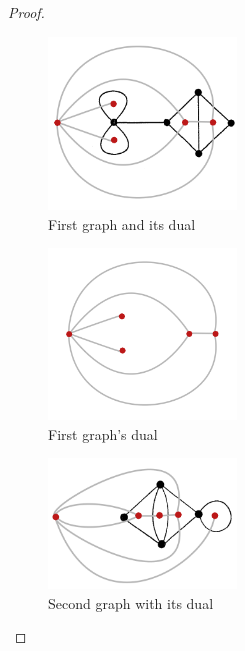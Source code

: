 \begin{proof}$\,$\pn
    \begin{figure}[H]
        \begin{center}
        \includegraphics[width=5cm]{Test2/Problem10/Figure1_4_and_its_dual.png}
        \end{center}                            
        \caption{First graph and its dual}
        \label{t2:p10_Figure1_4_and_its_dual.png}                        
    \end{figure}\pn 
    
    \begin{figure}[H]
        \begin{center}
        \includegraphics[width=5cm]{Test2/Problem10/Figure1_4_dual.png}
        \end{center}                            
        \caption{First graph's dual}
        \label{t2:p10_Figure1_4_dual.png}                        
    \end{figure}\pn       
    
    \begin{figure}[H]
        \begin{center}
        \includegraphics[width=5cm]{Test2/Problem10/Figure1_28_and_its_dual.png}
        \end{center}                            
        \caption{Second graph with its dual}
        \label{t2:p10_Figure1_28_and_its_dual.png}                        
    \end{figure}\pn   
        

\end{proof}
